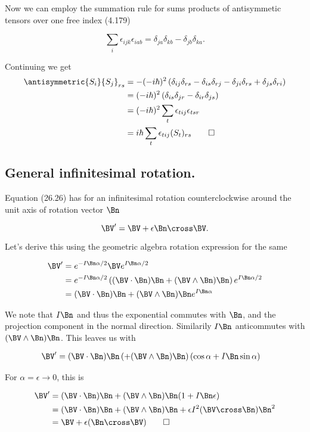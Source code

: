 Now we can employ the summation rule for sums products of antisymmetic tensors over one free index (4.179) 

\begin{equation}\label{eqn:desaiCh26:50}
\sum_i 
\epsilon_{ijk} \epsilon_{iab}
= 
\delta_{ja}
\delta_{kb}
-\delta_{jb}
\delta_{ka}.
\end{equation}

Continuing we get
\begin{align*}
{\antisymmetric{S_i}{S_j}}_{rs} 
&=
-(-i\hbar)^2 \left(
\delta_{ij}
\delta_{rs}
-\delta_{is}
\delta_{rj}
-\delta_{ji}
\delta_{rs}
+\delta_{js}
\delta_{ri} \right) \\
&=
(-i\hbar)^2 \left( 
\delta_{is}
\delta_{jr}
-
\delta_{ir} 
\delta_{js}
\right)
\\
&=
(-i\hbar)^2 \sum_t \epsilon_{tij} \epsilon_{tsr}
\\
&=
i\hbar \sum_t \epsilon_{tij} (S_t)_{rs}
\qquad\square
\end{align*}

\subsection{General infinitesimal rotation.}

Equation (26.26) has for an infinitesimal rotation counterclockwise around the unit axis of rotation vector $\Bn$

\begin{equation}\label{eqn:desaiCh26:60}
\BV' = \BV + \epsilon \Bn \cross \BV.
\end{equation}

Let's derive this using the geometric algebra rotation expression for the same

\begin{align*}
\BV' 
&=
e^{-I\Bn \alpha/2}
\BV 
e^{I\Bn \alpha/2} \\
&=
e^{-I\Bn \alpha/2}
\left(
(\BV \cdot \Bn)\Bn
+(\BV \wedge \Bn)\Bn
\right)
e^{I\Bn \alpha/2} \\
&=
(\BV \cdot \Bn)\Bn
+(\BV \wedge \Bn)\Bn
e^{I\Bn \alpha}
\end{align*}

We note that $I\Bn$ and thus the exponential commutes with $\Bn$, and the projection component in the normal direction.  Similarily $I\Bn$ anticommutes with $(\BV \wedge \Bn) \Bn$.  This leaves us with

\begin{align*}
\BV' 
&=
(\BV \cdot \Bn)\Bn
\left(
+(\BV \wedge \Bn)\Bn
\right)
( \cos \alpha + I \Bn \sin\alpha)
\end{align*}

For $\alpha = \epsilon \rightarrow 0$, this is

\begin{align*}
\BV' 
&=
(\BV \cdot \Bn)\Bn
+(\BV \wedge \Bn)\Bn
( 1 + I \Bn \epsilon) \\
&=
(\BV \cdot \Bn)\Bn 
+(\BV \wedge \Bn)\Bn
+\epsilon I^2(\BV \cross \Bn)\Bn^2 \\
&=
\BV
+ \epsilon (\Bn \cross \BV) \qquad\square
\end{align*}

\EndArticle
